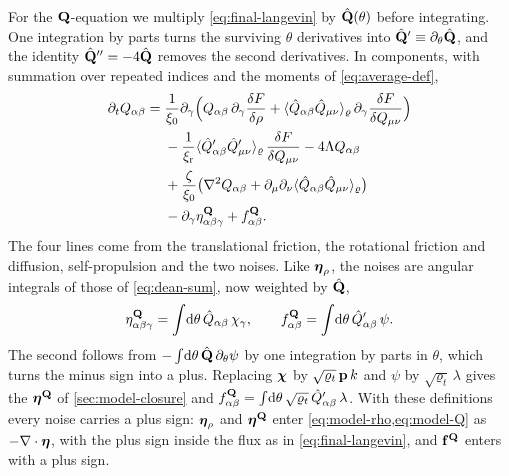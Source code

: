 \documentclass[aps,pre,reprint,superscriptaddress,longbibliography,nofootinbib
]{revtex4-2}
\begin{document}
For the $\mathbf{Q}$-equation we multiply \cref{eq:final-langevin}
by $\hat{\mathbf{Q}}(\theta)$ before integrating. One integration by
parts turns the surviving $\theta$ derivatives into
$\hat{\mathbf{Q}}'\equiv\partial_\theta\hat{\mathbf{Q}}$, and the identity
$\hat{\mathbf{Q}}''=-4\hat{\mathbf{Q}}$ removes the second derivatives. In
components, with summation over repeated indices and the
moments of \cref{eq:average-def},
\begin{align}
  \label{eq:Q-full}
  \partial_t Q_{\alpha\beta} = {}& \frac1{\xi_0}\partial_\gamma\Bigl(Q_{\alpha\beta}\,\partial_\gamma\frac{\delta F}{\delta\rho}
  + \langle\hat Q_{\alpha\beta}\hat Q_{\mu\nu}\rangle_\varrho\,\partial_\gamma\frac{\delta F}{\delta Q_{\mu\nu}}\Bigr)
  \nonumber\\
  &- \frac1{\xi_{\rm r}}\langle\hat Q'_{\alpha\beta}\hat Q'_{\mu\nu}\rangle_\varrho\,\frac{\delta F}{\delta Q_{\mu\nu}}
  - 4\Lambda Q_{\alpha\beta}
  \nonumber\\
  &+ \frac{\zeta}{\xi_0}\bigl(\nabla^2Q_{\alpha\beta}
  + \partial_\mu\partial_\nu\langle\hat Q_{\alpha\beta}\hat Q_{\mu\nu}\rangle_\varrho\bigr)
  \nonumber\\
  &- \partial_\gamma\eta^{\mathbf{Q}}_{{\alpha\beta}\gamma} + f^{\mathbf{Q}}_{\alpha\beta} .
\end{align}
The four lines come from the translational friction, the
rotational friction and diffusion, self-propulsion and the
two noises. Like $\boldsymbol\eta_\rho$, the noises are angular
integrals of those of \cref{eq:dean-sum}, now weighted by
$\hat{\mathbf{Q}}$,
\begin{align}
  \label{eq:Q-noise-chi}
  \eta^{\mathbf{Q}}_{{\alpha\beta}\gamma}=\int\!\mathrm{d}\theta\,\hat Q_{\alpha\beta}\,\chi_\gamma,
  \qquad
  f^{\mathbf{Q}}_{\alpha\beta}=\int\!\mathrm{d}\theta\,\hat Q'_{\alpha\beta}\,\psi.
\end{align}
The second follows from
$-\int\!\mathrm{d}\theta\,\hat{\mathbf{Q}}\,\partial_\theta\psi$ by one
integration by parts in $\theta$, which turns the minus
sign into a plus. Replacing $\boldsymbol\chi$ by
$\sqrt{\varrho_t}\,\mathbf{p}\,k$ and $\psi$ by
$\sqrt{\varrho_t}\,\lambda$ gives the $\boldsymbol\eta^{\mathbf{Q}}$ of
\cref{sec:model-closure} and
$f^{\mathbf{Q}}_{\alpha\beta}=\int\!\mathrm{d}\theta\,\sqrt{\varrho_t}\,\hat
Q'_{\alpha\beta}\,\lambda$. With these definitions every noise
carries a plus sign: $\boldsymbol\eta_\rho$ and $\boldsymbol\eta^{\mathbf{Q}}$ enter
\cref{eq:model-rho,eq:model-Q} as $-\nabla\cdot\boldsymbol\eta$, with
the plus sign inside the flux as in
\cref{eq:final-langevin}, and $\mathbf{f}^{\mathbf{Q}}$ enters with a plus
sign.
\end{document}
